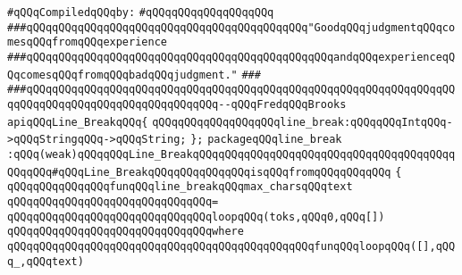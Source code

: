 \label{src/lib/compiler/back/low/library/line-break.pkg}
\newline
\verb|#qQQqCompiledqQQqby:|\newline
\verb|#qQQqqQQqqQQqqQQqqQQq|\newline
\newline
\newline
\newline
\verb|###qQQqqQQqqQQqqQQqqQQqqQQqqQQqqQQqqQQqqQQqqQQq"GoodqQQqjudgmentqQQqcomesqQQqfromqQQqexperience|\newline
\verb|###qQQqqQQqqQQqqQQqqQQqqQQqqQQqqQQqqQQqqQQqqQQqqQQqandqQQqexperienceqQQqcomesqQQqfromqQQqbadqQQqjudgment."|\newline
\verb|###|\newline
\verb|###qQQqqQQqqQQqqQQqqQQqqQQqqQQqqQQqqQQqqQQqqQQqqQQqqQQqqQQqqQQqqQQqqQQqqQQqqQQqqQQqqQQqqQQqqQQqqQQqqQQq--qQQqFredqQQqBrooks|\newline
\newline
\newline
\newline
\verb|apiqQQqLine_BreakqQQq{|\newline
\newline
\verb|qQQqqQQqqQQqqQQqqQQqline_break:qQQqqQQqIntqQQq->qQQqStringqQQq->qQQqString;|\newline
\verb|};|\newline
\newline
\verb|packageqQQqline_break|\newline
\newline
\verb|:qQQq(weak)qQQqqQQqLine_BreakqQQqqQQqqQQqqQQqqQQqqQQqqQQqqQQqqQQqqQQqqQQqqQQq#qQQqLine_BreakqQQqqQQqqQQqqQQqisqQQqfromqQQqqQQqqQQq|\newline
\newline
\verb|{|\newline
\verb|qQQqqQQqqQQqqQQqfunqQQqline_breakqQQqmax_charsqQQqtext|\newline
\verb|qQQqqQQqqQQqqQQqqQQqqQQqqQQqqQQq=|\newline
\verb|qQQqqQQqqQQqqQQqqQQqqQQqqQQqqQQqloopqQQq(toks,qQQq0,qQQq[])|\newline
\verb|qQQqqQQqqQQqqQQqqQQqqQQqqQQqqQQqwhere|\newline
\verb|qQQqqQQqqQQqqQQqqQQqqQQqqQQqqQQqqQQqqQQqqQQqqQQqfunqQQqloopqQQq([],qQQq_,qQQqtext)|\newline
